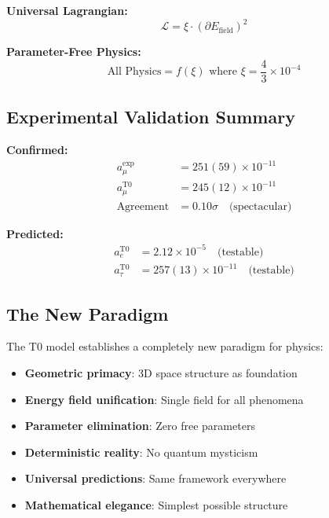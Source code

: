 \documentclass[12pt,a4paper]{report}
\begin{document}
\textbf{Universal Lagrangian:}
\begin{equation}
	\mathcal{L} = \xi \cdot (\partial E_{\text{field}})^2
\end{equation}

\textbf{Parameter-Free Physics:}
\begin{equation}
	\boxed{\text{All Physics} = f(\xi) \text{ where } \xi = \frac{4}{3} \times 10^{-4}}
\end{equation}

\subsection{Experimental Validation Summary}
\label{subsec:experimental_summary}

\textbf{Confirmed:}
\begin{align}
	a_\mu^{\text{exp}} &= 251(59) \times 10^{-11} \\
	a_\mu^{\text{T0}} &= 245(12) \times 10^{-11} \\
	\text{Agreement} &= 0.10\sigma \quad \text{(spectacular)}
\end{align}

\textbf{Predicted:}
\begin{align}
	a_e^{\text{T0}} &= 2.12 \times 10^{-5} \quad \text{(testable)} \\
	a_\tau^{\text{T0}} &= 257(13) \times 10^{-11} \quad \text{(testable)}
\end{align}

\subsection{The New Paradigm}
\label{subsec:new_paradigm}

The T0 model establishes a completely new paradigm for physics:

\begin{itemize}
	\item \textbf{Geometric primacy}: 3D space structure as foundation
	\item \textbf{Energy field unification}: Single field for all phenomena
	\item \textbf{Parameter elimination}: Zero free parameters
	\item \textbf{Deterministic reality}: No quantum mysticism
	\item \textbf{Universal predictions}: Same framework everywhere
	\item \textbf{Mathematical elegance}: Simplest possible structure
\end{itemize}
\end{document}
